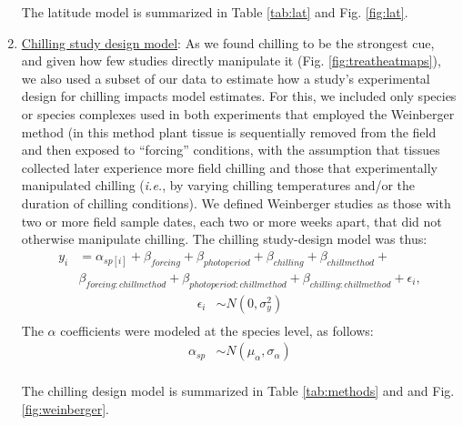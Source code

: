 \documentclass{article}
\begin{document}
\begin{enumerate}
\par The latitude model is summarized in Table \ref{tab:lat} and Fig. \ref{fig:lat}.
\item \underline{Chilling study design model}:
As we found chilling to be the strongest cue, and given how few studies directly manipulate it (Fig. \ref{fig:treatheatmaps}), we also used a subset of our data to estimate how a study's experimental design for chilling impacts model estimates. For this, we included only species or species complexes used in both experiments that employed the Weinberger method (in this method plant tissue is sequentially removed from the field and then exposed to ``forcing'' conditions, with the assumption that tissues collected later experience more field chilling \emph{\citep{weinberger1950}} and those that experimentally manipulated chilling (\emph{i.e.}, by varying chilling temperatures and/or the duration of chilling conditions). We defined Weinberger studies as those with two or more field sample dates, each two or more weeks apart, that did not otherwise manipulate chilling. The chilling study-design model was thus:
\begin{align*}
y_i &= \alpha_{sp[i]} + \beta_{forcing} + \beta_{photoperiod} + \beta_{chilling} + \beta_{chillmethod} + \\ & \beta_{forcing:chillmethod} + \beta_{photoperiod:chillmethod} + \beta_{chilling:chillmethod} + \epsilon_{i},
\end{align*}
\begin{align*}
\epsilon_i & \sim N(0,\sigma^2_y) \\
\end{align*}
\noindent The $\alpha$ coefficients were modeled at the species level, as follows:
\begin{align*}
\alpha_{sp} & \sim N(\mu_{\alpha}, \sigma_{\alpha}) \\
\end{align*}
\par The chilling design model is summarized in Table \ref{tab:methods} and and Fig. \ref{fig:weinberger}.


\end{enumerate}
\end{document}
